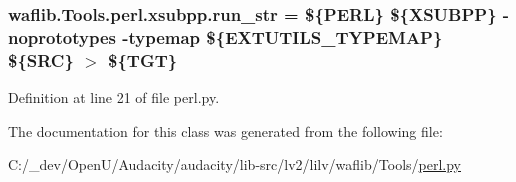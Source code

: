 \subsubsection[{\texorpdfstring{run\+\_\+str}{run_str}}]{ waflib.\+Tools.\+perl.\+xsubpp.\+run\+\_\+str = \textquotesingle{}\$\{P\+E\+RL\} \$\{X\+S\+U\+B\+PP\} -\/noprototypes -\/typemap \$\{E\+X\+T\+U\+T\+I\+L\+S\+\_\+\+T\+Y\+P\+E\+M\+AP\} \$\{S\+RC\} $>$ \$\{T\+GT\}\textquotesingle{}\hspace{0.3cm}{\ttfamily [static]}}\hypertarget{classwaflib_1_1_tools_1_1perl_1_1xsubpp_a2b5bf1d83630d743804e9a819b5642a7}{}\label{classwaflib_1_1_tools_1_1perl_1_1xsubpp_a2b5bf1d83630d743804e9a819b5642a7}


Definition at line 21 of file perl.\+py.



The documentation for this class was generated from the following file\+:\begin{DoxyCompactItemize}
\item 
C\+:/\+\_\+dev/\+Open\+U/\+Audacity/audacity/lib-\/src/lv2/lilv/waflib/\+Tools/\hyperlink{lilv_2waflib_2_tools_2perl_8py}{perl.\+py}\end{DoxyCompactItemize}
